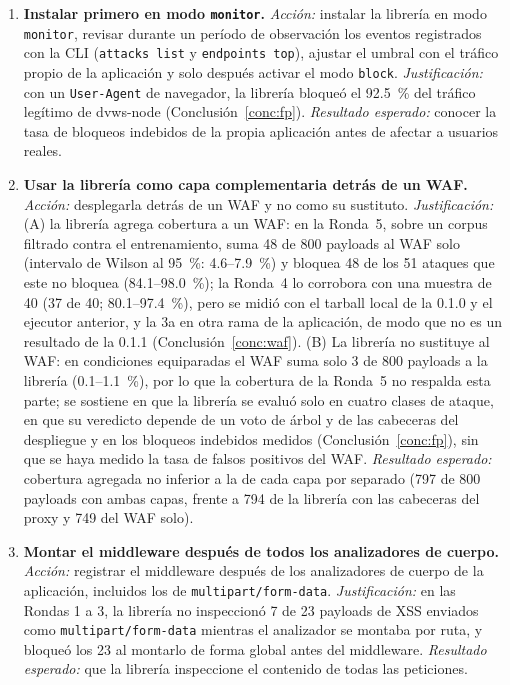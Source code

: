 \begin{enumerate}
    \item \textbf{Instalar primero en modo \texttt{monitor}.} \textit{Acción:} instalar la librería
    en modo \texttt{monitor}, revisar durante un período de observación los eventos registrados con
    la CLI (\texttt{attacks list} y \texttt{endpoints top}), ajustar el umbral con el tráfico propio
    de la aplicación y solo después activar el modo \texttt{block}. \textit{Justificación:} con un
    \texttt{User-Agent} de navegador, la librería bloqueó el 92.5~\% del tráfico legítimo de
    dvws-node (Conclusión~\ref{conc:fp}). \textit{Resultado esperado:} conocer la tasa de bloqueos
    indebidos de la propia aplicación antes de afectar a usuarios reales.

    \item \textbf{Usar la librería como capa complementaria detrás de un WAF.}
    \textit{Acción:} desplegarla detrás de un WAF y no como su sustituto. \textit{Justificación:}
    (A) la librería agrega cobertura a un WAF: en la Ronda~5, sobre un corpus filtrado contra el
    entrenamiento, suma 48 de 800 payloads al WAF solo (intervalo de Wilson al 95~\%: 4.6--7.9~\%) y
    bloquea 48 de los 51 ataques que este no bloquea (84.1--98.0~\%); la Ronda~4 lo corrobora con una
    muestra de 40 (37 de 40; 80.1--97.4~\%), pero se midió con el tarball local de la 0.1.0 y el
    ejecutor anterior, y la 3a en otra rama de la aplicación, de modo que no es un resultado de la 0.1.1 (Conclusión~\ref{conc:waf}). (B) La
    librería no sustituye al WAF: en condiciones equiparadas el WAF suma solo 3 de 800 payloads a la
    librería (0.1--1.1~\%), por lo que la cobertura de la Ronda~5 no respalda esta parte; se sostiene
    en que la librería se evaluó solo en cuatro clases de ataque, en que su veredicto depende de un
    voto de árbol y de las cabeceras del despliegue y en los bloqueos indebidos medidos
    (Conclusión~\ref{conc:fp}), sin que se haya medido la tasa de falsos positivos del WAF.
    \textit{Resultado esperado:} cobertura agregada no inferior a la de
    cada capa por separado (797 de 800 payloads con ambas capas, frente a 794 de la librería con las
    cabeceras del proxy y 749 del WAF solo).

    \item \textbf{Montar el middleware después de todos los analizadores de cuerpo.}
    \textit{Acción:} registrar el middleware después de los analizadores de cuerpo de la aplicación,
    incluidos los de \texttt{multipart/form-data}. \textit{Justificación:} en las Rondas 1 a 3, la
    librería no inspeccionó 7 de 23 payloads de XSS enviados como \texttt{multipart/form-data}
    mientras el analizador se montaba por ruta, y bloqueó los 23 al montarlo de forma global antes
    del middleware. \textit{Resultado esperado:} que la librería inspeccione el contenido de todas
    las peticiones.


\end{enumerate}
